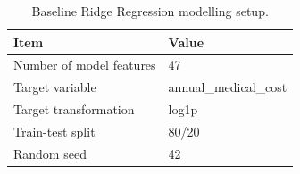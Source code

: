 \begin{table}
\caption{Baseline Ridge Regression modelling setup.}
\label{tab:03-ridge-feature-summary}
\begin{tabular}{ll}
\toprule
Item & Value \\
\midrule
Number of model features & 47 \\
Target variable & annual_medical_cost \\
Target transformation & log1p \\
Train-test split & 80/20 \\
Random seed & 42 \\
\bottomrule
\end{tabular}
\end{table}
